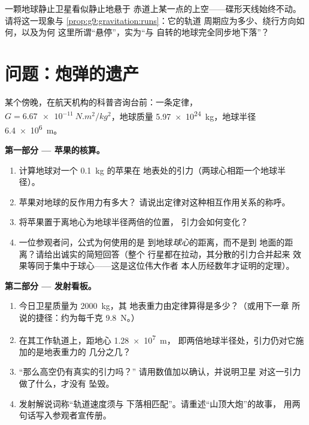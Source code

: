 \begin{exercise}[$\star\star\star$]\label{exo:g9:gravitation:12}
一颗地球静止卫星看似静止地悬于
赤道上某一点的上空——碟形天线始终不动。
请将这一现象与
\cref{prop:g9:gravitation:runs}：它的轨道
周期应为多少、绕行方向如何，以及为何
这里所谓“悬停”，实为“与
自转的地球完全同步地下落”？
\end{exercise}

\section{问题：炮弹的遗产}

\begin{problem}\label{pb:g9:gravitation:1}
某个傍晚，在航天机构的科普咨询台前：一条定律，
$G = \qty{6.67e-11}{N.m^2/kg^2}$，地球质量
\qty{5.97e24}{kg}，地球半径 \qty{6.4e6}{m}。

\medskip\noindent\textbf{第一部分 --- 苹果的核算。}
\begin{enumerate}
  \item 计算地球对一个 \qty{0.1}{kg} 的苹果在
        地表处的引力（两球心相距一个地球半径）。
  \item 苹果对地球的反作用力有多大？
        请说出定律对这种相互作用关系的称呼。
  \item 将苹果置于离地心为地球半径两倍的位置，
        引力会如何变化？
  \item 一位参观者问，公式为何使用的是
        到地球\emph{球心}的距离，而不是到
        地面的距离？请给出诚实的简短回答（整个
        行星都在拉动，其分散的引力合并起来
        效果等同于集中于球心——这是这位伟大作者
        本人历经数年才证明的定理）。
\end{enumerate}

\medskip\noindent\textbf{第二部分 --- 发射看板。}
\begin{enumerate}[resume]
  \item 今日卫星质量为 \qty{2000}{kg}，其
        地表重力由定律算得是多少？（或用下一章
        所说的捷径：约为每千克
        \qty{9.8}{N}。）
  \item 在其工作轨道上，距地心 \qty{1.28e7}{m}，
        即两倍地球半径处，引力仍对它施加的是地表重力的
        几分之几？
  \item “那么高空仍有真实的引力吗？”
        请用数值加以确认，并说明卫星
        对这一引力做了什么，才没有
        坠毁。
  \item 发射解说词称“轨道速度须与
        下落相匹配”。请重述“山顶大炮”的故事，
        用两句话写入参观者宣传册。
\end{enumerate}


\end{problem}
